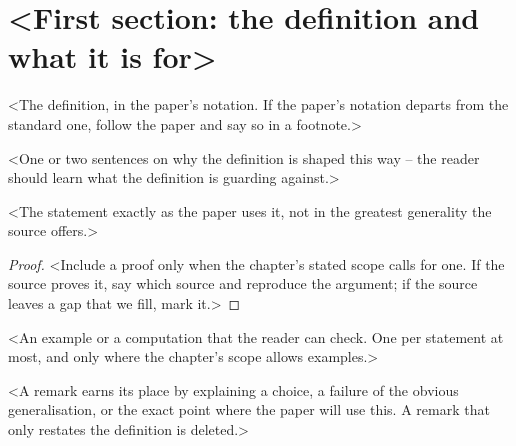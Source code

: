 \section{<First section: the definition and what it is for>}
\label{sec:SLUG-first}

%
\begin{defn}
\label{def:SLUG}
<The definition, in the paper's notation.  If the paper's notation departs
from the standard one, follow the paper and say so in a footnote.>
\end{defn}

<One or two sentences on why the definition is shaped this way -- the reader
should learn what the definition is guarding against.>

\begin{prop}
\label{prop:SLUG}
<The statement exactly as the paper uses it, not in the greatest generality
the source offers.>
\end{prop}

\begin{proof}
<Include a proof only when the chapter's stated scope calls for one.  If the
source proves it, say which source and reproduce the argument; if the source
leaves a gap that we fill, mark it.>
\end{proof}

\begin{ex}
\label{ex:SLUG}
<An example or a computation that the reader can check.  One per statement at
most, and only where the chapter's scope allows examples.>
\end{ex}

\begin{rem}
\label{rem:SLUG}
<A remark earns its place by explaining a choice, a failure of the obvious
generalisation, or the exact point where the paper will use this.  A remark
that only restates the definition is deleted.>
\end{rem}

